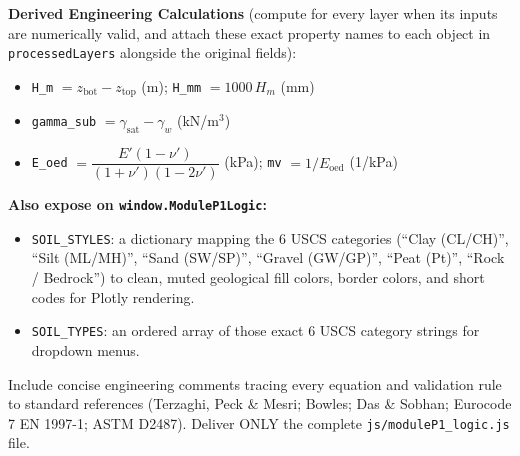 \documentclass[11pt,a4paper]{article}
\newcommand{\code}[1]{\texttt{\small #1}}
\begin{document}
\begin{prompt}
\textbf{Derived Engineering Calculations} (compute for every layer when its inputs are numerically valid, and attach
these exact property names to each object in \code{processedLayers} alongside the original fields):
\begin{itemize}
\item \code{H\_m} $= z_\text{bot} - z_\text{top}$ (m); \quad \code{H\_mm} $= 1000\,H_m$ (mm)
\item \code{gamma\_sub} $= \gamma_\text{sat} - \gamma_w$ (kN/m$^3$)
\item \code{E\_oed} $= \dfrac{E'(1-\nu')}{(1+\nu')(1-2\nu')}$ (kPa); \quad \code{mv} $= 1/E_\text{oed}$ (1/kPa)
\end{itemize}

\textbf{Also expose on \code{window.ModuleP1Logic}:}
\begin{itemize}
\item \code{SOIL\_STYLES}: a dictionary mapping the 6 USCS categories (``Clay (CL/CH)'', ``Silt (ML/MH)'', ``Sand
  (SW/SP)'', ``Gravel (GW/GP)'', ``Peat (Pt)'', ``Rock / Bedrock'') to clean, muted geological fill colors, border
  colors, and short codes for Plotly rendering.
\item \code{SOIL\_TYPES}: an ordered array of those exact 6 USCS category strings for dropdown menus.
\end{itemize}
Include concise engineering comments tracing every equation and validation rule to standard references (Terzaghi,
Peck \& Mesri; Bowles; Das \& Sobhan; Eurocode 7 EN 1997-1; ASTM D2487). Deliver ONLY the complete
\code{js/moduleP1\_logic.js} file.
\end{prompt}
\end{document}
